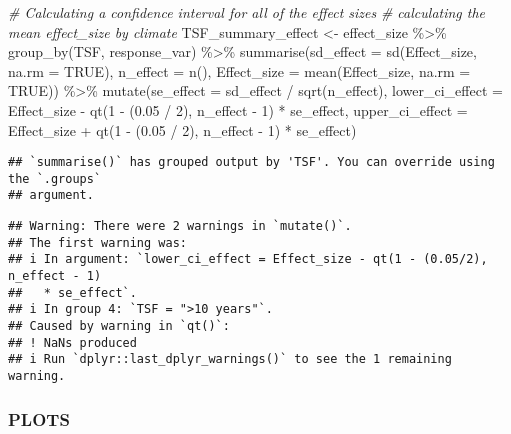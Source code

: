 \documentclass[
]{article}
\newenvironment{Shaded}{\begin{snugshade}}{\end{snugshade}}
\newcommand{\AttributeTok}[1]{\textcolor[rgb]{0.77,0.63,0.00}{#1}}
\newcommand{\CommentTok}[1]{\textcolor[rgb]{0.56,0.35,0.01}{\textit{#1}}}
\newcommand{\ConstantTok}[1]{\textcolor[rgb]{0.00,0.00,0.00}{#1}}
\newcommand{\DecValTok}[1]{\textcolor[rgb]{0.00,0.00,0.81}{#1}}
\newcommand{\FloatTok}[1]{\textcolor[rgb]{0.00,0.00,0.81}{#1}}
\newcommand{\FunctionTok}[1]{\textcolor[rgb]{0.00,0.00,0.00}{#1}}
\newcommand{\NormalTok}[1]{#1}
\newcommand{\OtherTok}[1]{\textcolor[rgb]{0.56,0.35,0.01}{#1}}
\newcommand{\SpecialCharTok}[1]{\textcolor[rgb]{0.00,0.00,0.00}{#1}}
\begin{document}
\begin{Shaded}
\begin{Highlighting}[]
\CommentTok{\# Calculating a confidence interval for all of the effect sizes}
\CommentTok{\# calculating the mean effect\_size by climate}
\NormalTok{TSF\_summary\_effect }\OtherTok{\textless{}{-}}\NormalTok{ effect\_size }\SpecialCharTok{\%\textgreater{}\%}
  \FunctionTok{group\_by}\NormalTok{(TSF, response\_var) }\SpecialCharTok{\%\textgreater{}\%}
  \FunctionTok{summarise}\NormalTok{(}\AttributeTok{sd\_effect =} \FunctionTok{sd}\NormalTok{(Effect\_size, }\AttributeTok{na.rm =} \ConstantTok{TRUE}\NormalTok{),}
            \AttributeTok{n\_effect =} \FunctionTok{n}\NormalTok{(),}
            \AttributeTok{Effect\_size =} \FunctionTok{mean}\NormalTok{(Effect\_size, }\AttributeTok{na.rm =} \ConstantTok{TRUE}\NormalTok{)) }\SpecialCharTok{\%\textgreater{}\%} 
 \FunctionTok{mutate}\NormalTok{(}\AttributeTok{se\_effect =}\NormalTok{ sd\_effect }\SpecialCharTok{/} \FunctionTok{sqrt}\NormalTok{(n\_effect),}
         \AttributeTok{lower\_ci\_effect =}\NormalTok{ Effect\_size }\SpecialCharTok{{-}} \FunctionTok{qt}\NormalTok{(}\DecValTok{1} \SpecialCharTok{{-}}\NormalTok{ (}\FloatTok{0.05} \SpecialCharTok{/} \DecValTok{2}\NormalTok{), n\_effect }\SpecialCharTok{{-}} \DecValTok{1}\NormalTok{) }\SpecialCharTok{*}\NormalTok{ se\_effect,}
         \AttributeTok{upper\_ci\_effect =}\NormalTok{ Effect\_size }\SpecialCharTok{+} \FunctionTok{qt}\NormalTok{(}\DecValTok{1} \SpecialCharTok{{-}}\NormalTok{ (}\FloatTok{0.05} \SpecialCharTok{/} \DecValTok{2}\NormalTok{), n\_effect }\SpecialCharTok{{-}} \DecValTok{1}\NormalTok{) }\SpecialCharTok{*}\NormalTok{ se\_effect)}
\end{Highlighting}
\end{Shaded}

\begin{verbatim}
## `summarise()` has grouped output by 'TSF'. You can override using the `.groups`
## argument.
\end{verbatim}

\begin{verbatim}
## Warning: There were 2 warnings in `mutate()`.
## The first warning was:
## i In argument: `lower_ci_effect = Effect_size - qt(1 - (0.05/2), n_effect - 1)
##   * se_effect`.
## i In group 4: `TSF = ">10 years"`.
## Caused by warning in `qt()`:
## ! NaNs produced
## i Run `dplyr::last_dplyr_warnings()` to see the 1 remaining warning.
\end{verbatim}

\hypertarget{plots}{%
\subsubsection{PLOTS}\label{plots}}
\end{document}
